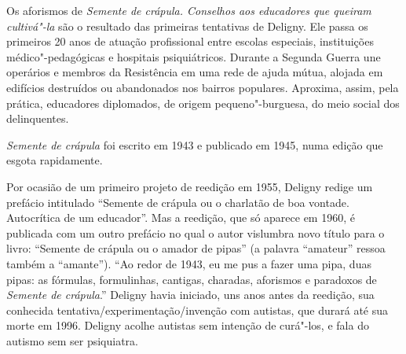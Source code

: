 




\pagebreak
\thispagestyle{empty}
\movetooddpage
\thispagestyle{empty}
\setcounter{footnote}{0}
\begin{vplace}[0.25]


{\large{}}
\end{vplace}

\pagebreak
\thispagestyle{empty}

\movetooddpage

Os aforismos de \emph{Semente de crápula. Conselhos aos educadores que
queiram cultivá"-la} são o resultado das primeiras tentativas de Deligny.
Ele passa os primeiros 20 anos de atuação profissional entre escolas
especiais, instituições médico"-pedagógicas e hospitais psiquiátricos.
Durante a Segunda Guerra une operários e membros da Resistência em uma
rede de ajuda mútua, alojada em edifícios destruídos ou abandonados nos
bairros populares. Aproxima, assim, pela prática, educadores diplomados,
de origem pequeno"-burguesa, do meio social dos delinquentes.~

\emph{Semente de crápula} foi escrito em 1943 e publicado em 1945, numa
edição que esgota rapidamente.

Por ocasião de um primeiro projeto de reedição em 1955, Deligny redige
um prefácio intitulado ``Semente de crápula ou o charlatão de boa
vontade. Autocrítica de um educador''. Mas a reedição, que só aparece em
1960, é publicada com um outro prefácio no qual o autor vislumbra novo
título para o livro: ``Semente de crápula ou o amador de pipas'' (a
palavra ``amateur'' ressoa também a ``amante''). ``Ao redor de 1943, eu
me pus a fazer uma pipa, duas pipas: as fórmulas, formulinhas, cantigas,
charadas, aforismos e paradoxos de \emph{Semente de crápula}.'' Deligny
havia iniciado, uns anos antes da reedição, sua conhecida
tentativa/experimentação/invenção com autistas, que durará até sua morte
em 1996. Deligny acolhe autistas sem intenção de curá"-los, e fala do
autismo sem ser psiquiatra.

